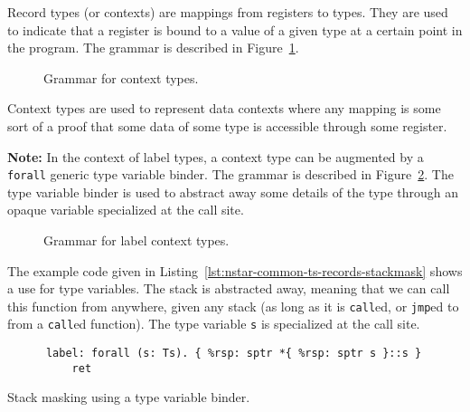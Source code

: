 Record types (or contexts) are mappings from registers to types.
They are used to indicate that a register is bound to a value of a given type at a certain point in the program.
The grammar is described in Figure~\ref{fig:nstar-common-ts-records-syntax}.

\begin{figure}[htb]
  \centering
  \caption{Grammar for context types.}
  \label{fig:nstar-common-ts-records-syntax}
\end{figure}

Context types are used to represent data contexts where any mapping is some sort of a proof that some data of some type is accessible through some register.

\vspace{\baselineskip}

\textbf{Note:} In the context of label types, a context type can be augmented by a \texttt{forall} generic type variable binder.
The grammar is described in Figure~\ref{fig:nstar-common-ts-label-types-syntax}.
The type variable binder is used to abstract away some details of the type through an opaque variable specialized at the call site.

\begin{figure}[htb]
  \centering
  \caption{Grammar for label context types.}
  \label{fig:nstar-common-ts-label-types-syntax}
\end{figure}

The example code given in Listing~\ref{lst:nstar-common-ts-records-stackmask} shows a use for type variables.
The stack is abstracted away, meaning that we can call this function from anywhere, given any stack (as long as it is \texttt{call}ed, or \texttt{jmp}ed to from a \texttt{call}ed function).
The type variable \texttt{s} is specialized at the call site.

\begin{listing}[htb]
  \centering
  \begin{minipage}{0.90\textwidth}
    \begin{verbatim}
      label: forall (s: Ts). { %rsp: sptr *{ %rsp: sptr s }::s }
          ret
    \end{verbatim}
  \end{minipage}
  \caption{Stack masking using a type variable binder.}
  \label{lst:nstar-common-ts-records-stackmask}
\end{listing}

